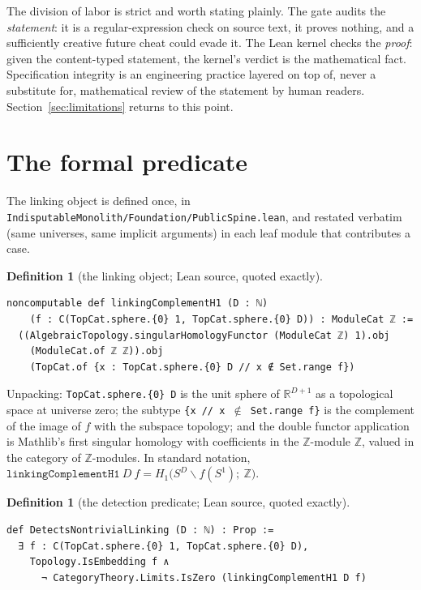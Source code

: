 \documentclass[11pt]{article}
\theoremstyle{definition}
\newtheorem{definition}[theorem]{Definition}
\newcommand{\Z}{\mathbb{Z}}
\newcommand{\R}{\mathbb{R}}
\newcommand{\Sph}[1]{S^{#1}}
\newcommand{\lean}[1]{\texttt{#1}}
\begin{document}
The division of labor is strict and worth stating plainly. The gate audits the \emph{statement}: it is a regular-expression check on source text, it proves nothing, and a sufficiently creative future cheat could evade it. The Lean kernel checks the \emph{proof}: given the content-typed statement, the kernel's verdict is the mathematical fact. Specification integrity is an engineering practice layered on top of, never a substitute for, mathematical review of the statement by human readers. Section~\ref{sec:limitations} returns to this point.

\section{The formal predicate}
\label{sec:predicate}

The linking object is defined once, in \lean{IndisputableMonolith/Foundation/PublicSpine.lean}, and restated verbatim (same universes, same implicit arguments) in each leaf module that contributes a case.

\begin{definition}[the linking object; Lean source, quoted exactly]
\label{def:h1-lean}
\begin{lstlisting}
noncomputable def linkingComplementH1 (D : ℕ)
    (f : C(TopCat.sphere.{0} 1, TopCat.sphere.{0} D)) : ModuleCat ℤ :=
  ((AlgebraicTopology.singularHomologyFunctor (ModuleCat ℤ) 1).obj
    (ModuleCat.of ℤ ℤ)).obj
    (TopCat.of {x : TopCat.sphere.{0} D // x ∉ Set.range f})
\end{lstlisting}
\end{definition}

Unpacking: \lean{TopCat.sphere.\{0\} D} is the unit sphere of $\R^{D+1}$ as a topological space at universe zero; the subtype \lean{\{x // x $\notin$ Set.range f\}} is the complement of the image of $f$ with the subspace topology; and the double functor application is Mathlib's first singular homology with coefficients in the $\Z$-module $\Z$, valued in the category of $\Z$-modules. In standard notation, $\lean{linkingComplementH1}\ D\ f = H_1\bigl(\Sph{D} \smallsetminus f(S^1);\ \Z\bigr)$.

\begin{definition}[the detection predicate; Lean source, quoted exactly]
\label{def:detects-lean}
\begin{lstlisting}
def DetectsNontrivialLinking (D : ℕ) : Prop :=
  ∃ f : C(TopCat.sphere.{0} 1, TopCat.sphere.{0} D),
    Topology.IsEmbedding f ∧
      ¬ CategoryTheory.Limits.IsZero (linkingComplementH1 D f)
\end{lstlisting}
\end{definition}
\end{document}
